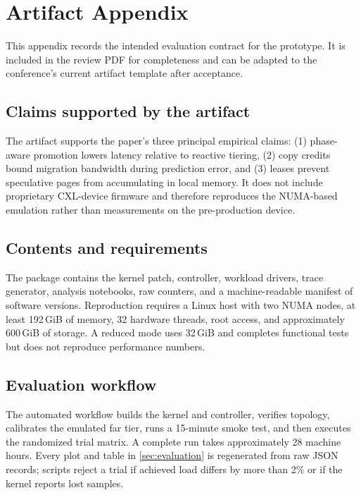 \section{Artifact Appendix}
\label{sec:artifact}

This appendix records the intended evaluation contract for the prototype.  It
is included in the review PDF for completeness and can be adapted to the
conference's current artifact template after acceptance.

\subsection{Claims supported by the artifact}

The artifact supports the paper's three principal empirical claims: (1)
phase-aware promotion lowers \ptail latency relative to reactive tiering, (2) copy
credits bound migration bandwidth during prediction error, and (3) leases
prevent speculative pages from accumulating in local memory.  It does not
include proprietary CXL-device firmware and therefore reproduces the NUMA-based
emulation rather than measurements on the pre-production device.

\subsection{Contents and requirements}

The package contains the kernel patch, controller, workload drivers, trace
generator, analysis notebooks, raw counters, and a machine-readable manifest
of software versions.  Reproduction requires a Linux host with two NUMA nodes,
at least 192\,GiB of memory, 32 hardware threads, root access, and approximately
600\,GiB of storage.  A reduced mode uses 32\,GiB and completes functional tests
but does not reproduce performance numbers.

\subsection{Evaluation workflow}

The automated workflow builds the kernel and controller, verifies topology,
calibrates the emulated far tier, runs a 15-minute smoke test, and then executes
the randomized trial matrix.  A complete run takes approximately 28 machine
hours.  Every plot and table in \cref{sec:evaluation} is regenerated from raw
JSON records; scripts reject a trial if achieved load differs by more than 2\%
or if the kernel reports lost samples.

